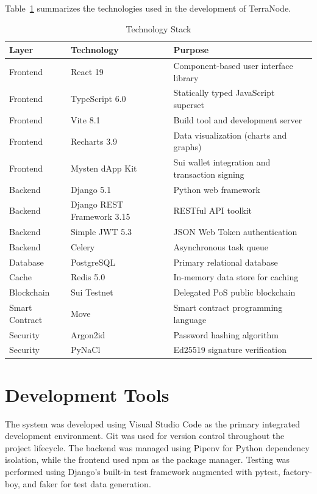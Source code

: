 Table~\ref{tab:tech_stack} summarizes the technologies used in the development of TerraNode.

\begin{table}[H]
\centering
\caption{Technology Stack}
\label{tab:tech_stack}
\begin{tabularx}{\textwidth}{|l|l|X|}
\hline
\textbf{Layer} & \textbf{Technology} & \textbf{Purpose} \\
\hline
Frontend & React 19 & Component-based user interface library \\
\hline
Frontend & TypeScript 6.0 & Statically typed JavaScript superset \\
\hline
Frontend & Vite 8.1 & Build tool and development server \\
\hline
Frontend & Recharts 3.9 & Data visualization (charts and graphs) \\
\hline
Frontend & Mysten dApp Kit & Sui wallet integration and transaction signing \\
\hline
Backend & Django 5.1 & Python web framework \\
\hline
Backend & Django REST Framework 3.15 & RESTful API toolkit \\
\hline
Backend & Simple JWT 5.3 & JSON Web Token authentication \\
\hline
Backend & Celery & Asynchronous task queue \\
\hline
Database & PostgreSQL & Primary relational database \\
\hline
Cache & Redis 5.0 & In-memory data store for caching \\
\hline
Blockchain & Sui Testnet & Delegated PoS public blockchain \\
\hline
Smart Contract & Move & Smart contract programming language \\
\hline
Security & Argon2id & Password hashing algorithm \\
\hline
Security & PyNaCl & Ed25519 signature verification \\
\hline
\end{tabularx}
\end{table}

\section{Development Tools}

The system was developed using Visual Studio Code as the primary integrated development environment. Git was used for version control throughout the project lifecycle. The backend was managed using Pipenv for Python dependency isolation, while the frontend used npm as the package manager. Testing was performed using Django's built-in test framework augmented with pytest, factory-boy, and faker for test data generation.

